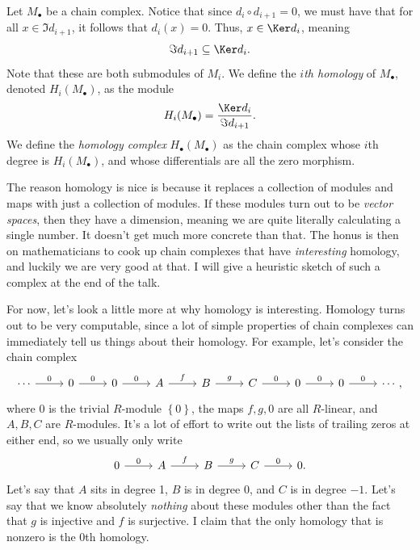 \begin{definition}\label{dfn:homology}
	Let $M_{\bullet} $ be a chain complex. Notice that since $d_i \circ d_{i+1} =0$, we must have that for all $x\in \Im d_{i+1} $, it follows that $d_i(x)=0$. Thus, $x\in \Ker d_i$, meaning
	\[
		\Im d_{i+1} \subseteq \Ker d_i
	.\]
	Note that these are both submodules of $M_i$. We define the \emph{$i$th homology} of $M_{\bullet} $, denoted $H_i(M_{\bullet} )$, as the module
	\[
		H_i(M_{\bullet} )=\frac{\Ker d_{i} }{\Im d_{i+1} } 
	.\]
	We define the \emph{homology complex} $H_{\bullet} (M_{\bullet} )$ as the chain complex whose $i$th degree is $H_i(M_{\bullet} )$, and whose differentials are all the zero morphism.
\end{definition}

The reason homology is nice is because it replaces a collection of modules and maps with just a collection of modules. If these modules turn out to be \emph{vector spaces}, then they have a dimension, meaning we are quite literally calculating a single number. It doesn't get much more concrete than that. The honus is then on mathematicians to cook up chain complexes that have \emph{interesting} homology, and luckily we are very good at that. I will give a heuristic sketch of such a complex at the end of the talk.

For now, let's look a little more at why homology is interesting. Homology turns out to be very computable, since a lot of simple properties of chain complexes can immediately tell us things about their homology. For example, let's consider the chain complex
\[
	\begin{tikzcd}[row sep = 2.5em, column sep = 2.5em]
		\cdots \ar[" 0 ", r] & 0 \ar[" 0 ", r] & 0 \ar[" 0 ", r]  & A \ar[" f ", r]  & B \ar[" g ", r]  & C \ar[" 0 ", r]  & 0 \ar[" 0 ", r] & 0 \ar[" 0 ", r] & \cdots ,
\end{tikzcd}
\]
where $0$ is the trivial $R$-module $\left\{ 0 \right\} $, the maps $f,g,0$ are all $R$-linear, and $A,B,C$ are $R$-modules. It's a lot of effort to write out the lists of trailing zeros at either end, so we usually only write
\[
	\begin{tikzcd}[row sep = 2.5em, column sep = 2.5em]
	0 \ar[r, "0"] & A \ar[r, "f"] & B \ar[r, "g"] & C \ar[r, "0"] & 0.
\end{tikzcd}
\]
Let's say that $A$ sits in degree 1, $B$ is in degree 0, and $C$ is in degree $-1$. Let's say that we know absolutely \emph{nothing} about these modules other than the fact that $g$ is injective and $f$ is surjective. I claim that the only homology that is nonzero is the 0th homology.

